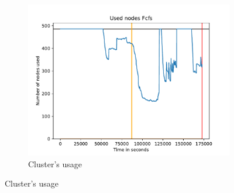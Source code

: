 \documentclass[a4paper]{article}
\begin{document}
\begin{figure}[H]\centering
\begin{subfigure}[b]{0.4\linewidth}\centering\includegraphics[width=1\linewidth]{MBSS/plot/2022-01-17->2022-01-17_V9271_Fcfs_Used_nodes_450_128_32_256_4_1024.pdf}\caption{Cluster's usage}\end{subfigure}

\end{figure}
\end{document}
